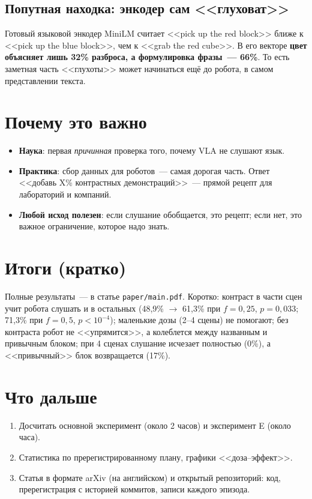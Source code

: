 \documentclass[11pt]{article}
\begin{document}
\subsection*{Попутная находка: энкодер сам <<глуховат>>}

Готовый языковой энкодер MiniLM считает <<pick up the red block>> ближе к <<pick up the blue
block>>, чем к <<grab the red cube>>. В его векторе \textbf{цвет объясняет лишь 32\% разброса,
а формулировка фразы~--- 66\%}. То есть заметная часть <<глухоты>> может начинаться ещё до
робота, в самом представлении текста.

\section{Почему это важно}

\begin{itemize}
\item \textbf{Наука}: первая \emph{причинная} проверка того, почему VLA не слушают язык.
\item \textbf{Практика}: сбор данных для роботов~--- самая дорогая часть. Ответ <<добавь X\%
контрастных демонстраций>>~--- прямой рецепт для лабораторий и компаний.
\item \textbf{Любой исход полезен}: если слушание обобщается, это рецепт; если нет, это важное
ограничение, которое надо знать.
\end{itemize}

\section{Итоги (кратко)}

Полные результаты~--- в статье \texttt{paper/main.pdf}. Коротко: контраст в части сцен учит робота
слушать и в остальных (48,9\% $\to$ 61,3\% при $f=0{,}25$, $p=0{,}033$; 71,3\% при $f=0{,}5$, $p<10^{-4}$);
маленькие дозы (2--4 сцены) не помогают; без контраста робот не <<упрямится>>, а колеблется между
названным и привычным блоком; при 4 сценах слушание исчезает полностью (0\%), а <<привычный>> блок
возвращается (17\%).

\section{Что дальше}

\begin{enumerate}
\item Досчитать основной эксперимент (около 2 часов) и эксперимент E (около часа).
\item Статистика по пререгистрированному плану, графики <<доза--эффект>>.
\item Статья в формате arXiv (на английском) и открытый репозиторий: код, пререгистрация
с историей коммитов, записи каждого эпизода.
\end{enumerate}



\end{document}
